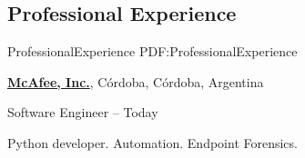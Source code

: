 \documentclass[letterpaper,MMMyyyy,nonstop]{simpleresumecv}
\begin{document}
\begin{body}

%
%


%
%


\section
{Professional \newline
	Experience}
{ProfessionalExperience}
{PDF:ProfessionalExperience}

\href{http://www.mcafee.com}
{\textbf{McAfee, Inc.}},
Córdoba, Córdoba, Argentina

\GapNoBreak
\BulletItem
Software Engineer
\hfill
{} --
Today
\begin{detail}
	\SubBulletItem
	Python developer.
	\SubBulletItem
	Automation.
	\SubBulletItem
	Endpoint Forensics.
\end{detail}



\end{body}
\end{document}
